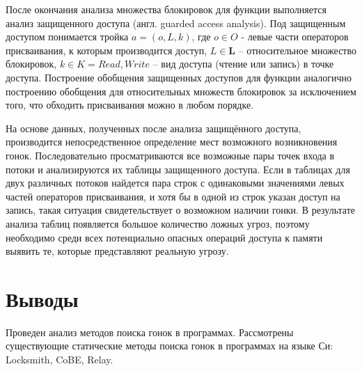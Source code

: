 После окончания анализа множества блокировок для функции выполняется анализ защищенного доступа (англ. guarded access analysis). Под защищенным доступом понимается тройка $a = (o, L, k)$, где $o \in O$ - левые части операторов присваивания, к которым производится доступ, $L \in \mathbf{L}$ – относительное множество блокировок, $k \in K = {Read, Write}$ – вид доступа (чтение или запись) в точке доступа. Построение обобщения защищенных доступов для функции аналогично построению обобщения для относительных множеств блокировок за исключением того, что обходить присваивания можно в любом порядке.

На основе данных, полученных после анализа защищённого доступа, производится непосредственное определение мест возможного возникновения гонок. Последовательно просматриваются все возможные пары точек входа в потоки и анализируются их таблицы защищенного доступа. Если в таблицах для двух различных потоков найдется пара строк с одинаковыми значениями левых частей операторов присваивания, и хотя бы в одной из строк указан доступ на запись, такая ситуация свидетельствует о возможном наличии гонки. В результате анализа таблиц появляется большое количество ложных угроз, поэтому необходимо среди всех потенциально опасных операций доступа к памяти выявить те, которые представляют реальную угрозу.


\section{Выводы}

Проведен анализ методов поиска гонок в программах. Рассмотрены существующие статические методы поиска гонок в программах на языке Си: Locksmith, CoBE, Relay.
